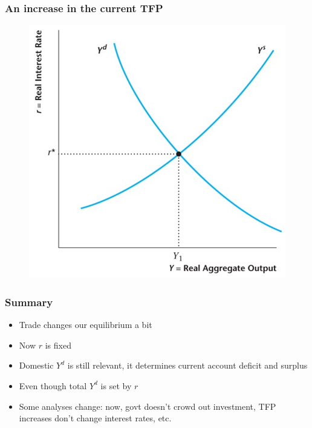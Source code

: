 \documentclass{beamer}
\begin{document}
\begin{frame}
\frametitle[alignment=center]{An increase in the current TFP}
\begin{figure}
\centering
\includegraphics[scale=0.55]{Figures/W_Fig_16pt11.png}
\end{figure}
\end{frame}

\begin{frame}
\frametitle[alignment=center]{Summary}
\begin{itemize}
\item Trade changes our equilibrium a bit
\bigskip
\item Now $r$ is fixed
\bigskip
\item Domestic $Y^d$ is still relevant, it determines current account deficit and surplus
\bigskip
\item Even though total $Y^d$ is set by $r$
\bigskip
\item Some analyses change:  now, govt doesn't crowd out investment, TFP increases don't change interest rates, etc.
\end{itemize}
\end{frame}
\end{document}
